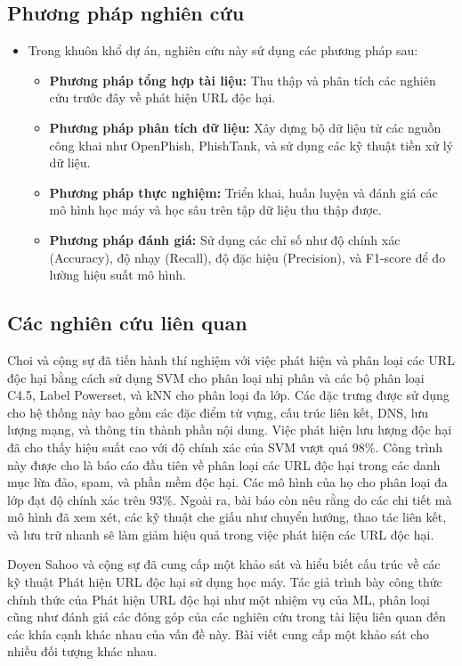 \documentclass[13pt]{article}
\begin{document}
    \subsection{Phương pháp nghiên cứu}
\begin{itemize}
    \item Trong khuôn khổ dự án, nghiên cứu này sử dụng các phương pháp sau:
    \begin{itemize}
        \item \textbf{Phương pháp tổng hợp tài liệu: } Thu thập và phân tích các nghiên cứu trước đây về phát hiện URL độc hại.
        \item \textbf{Phương pháp phân tích dữ liệu: } Xây dựng bộ dữ liệu từ các nguồn công khai như OpenPhish, PhishTank, và sử dụng các kỹ thuật tiền xử lý dữ liệu.
        \item \textbf{Phương pháp thực nghiệm: } Triển khai, huấn luyện và đánh giá các mô hình học máy và học sâu trên tập dữ liệu thu thập được.
        \item \textbf{Phương pháp đánh giá: } Sử dụng các chỉ số như độ chính xác (Accuracy), độ nhạy (Recall), độ đặc hiệu (Precision), và F1-score để đo lường hiệu suất mô hình.
    \end{itemize}
\end{itemize}

    \subsection{Các nghiên cứu liên quan}
    Choi và cộng sự đã tiến hành thí nghiệm với việc phát hiện và phân loại các URL độc hại bằng cách sử dụng SVM cho phân loại nhị phân và các bộ phân loại C4.5, Label Powerset, và kNN cho phân loại đa lớp. Các đặc trưng được sử dụng cho hệ thống này bao gồm các đặc điểm từ vựng, cấu trúc liên kết, DNS, lưu lượng mạng, và thông tin thành phần nội dung. Việc phát hiện lưu lượng độc hại đã cho thấy hiệu suất cao với độ chính xác của SVM vượt quá 98\%. Công trình này được cho là báo cáo đầu tiên về phân loại các URL độc hại trong các danh mục lừa đảo, spam, và phần mềm độc hại. Các mô hình của họ cho phân loại đa lớp đạt độ chính xác trên 93\%. Ngoài ra, bài báo còn nêu rằng do các chi tiết mà mô hình đã xem xét, các kỹ thuật che giấu như chuyển hướng, thao tác liên kết, và lưu trữ nhanh sẽ làm giảm hiệu quả trong việc phát hiện các URL độc hại.
    
    Doyen Sahoo và cộng sự đã cung cấp một khảo sát và hiểu biết cấu trúc về các kỹ thuật Phát hiện URL độc hại sử dụng học máy. Tác giả trình bày công thức chính thức của Phát hiện URL độc hại như một nhiệm vụ của ML, phân loại cũng như đánh giá các đóng góp của các nghiên cứu trong tài liệu liên quan đến các khía cạnh khác nhau của vấn đề này. Bài viết cung cấp một khảo sát cho nhiều đối tượng khác nhau.
    
\end{document}
